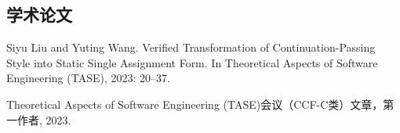 
\begin{achievements}

\subsection*{学术论文}

\begin{bibliolist}{00}
  \item Siyu Liu and Yuting Wang. Verified Transformation of Continuation-Passing 
    Style into Static Single Assignment Form. 
    In Theoretical Aspects of Software Engineering (TASE), 2023: 20–37. 
\end{bibliolist}

\begin{bibliolist*}{00}
  \item Theoretical Aspects of Software Engineering (TASE)会议（CCF-C类）文章，第一作者, 2023.
\end{bibliolist*}

\end{achievements}
